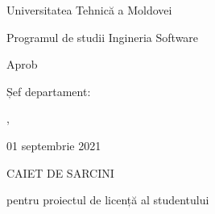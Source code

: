 \newcommand{\studyprogramname}{Programul de studii Ingineria Software}
\newcommand{\councilnr}{2}
\newcommand{\councildate}{01 septembrie 2021}
\newcommand{\thesisdeadline}{31 mai 2022}
\newcommand{\taskdate}{01 septembrie 2021}


\setcounter{rowcount}{0}
\def\rownumber{\stepcounter{rowcount}\arabic{rowcount}.}

\begin{titlepage}
	\begin{titlepagefont}
	    \centering
	    \bfseries

        {\large Universitatea Tehnică a Moldovei \par}
        \bigskip
        
        \begin{minipage}{0.75\textwidth}
            {\facultyname \par}
            {\departmentname \par}
            {\studyprogramname \par}            
        \end{minipage}


    	\vfill
    	
    	\hfill
    	\begin{minipage}{0.35\textwidth}
    	    \raggedleft
        	{\small Aprob \par}
        	{\small Șef departament: \par}
        	{\small \departmentchiefname, \departmentchieftitle \par}
        	\bigskip
        	{\small \dotfill \par}
        	{\small \councildate \par}
        \end{minipage}
    	
    	\vfill
    	
    	{\large CAIET DE SARCINI \par}
    	{\large pentru proiectul de licență al studentului \par}
    	{\large \studentname \par}
    	
    	\vfill
    	
        \begin{enumerate}[label=\arabic*.]
        

\end{enumerate}
\end{titlepagefont}
\end{titlepage}
